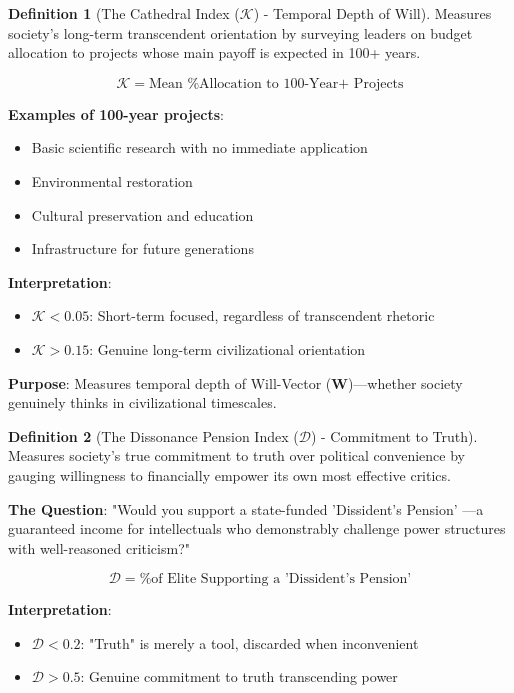 \documentclass[11pt,a4paper]{article}
\theoremstyle{definition}
\newtheorem{definition}{Definition}[section]
\theoremstyle{remark}
\begin{document}
\begin{small}
\begin{definition}[The Cathedral Index (\(\mathcal{K}\)) - Temporal Depth of Will]
Measures society's long-term transcendent orientation by surveying leaders on budget allocation to projects whose main payoff is expected in 100+ years.

\begin{equation}
\mathcal{K} = \text{Mean \% Allocation to 100-Year+ Projects}
\end{equation}

\textbf{Examples of 100-year projects}:
\begin{itemize}
    \item Basic scientific research with no immediate application
    \item Environmental restoration
    \item Cultural preservation and education
    \item Infrastructure for future generations
\end{itemize}

\textbf{Interpretation}:
\begin{itemize}
    \item \(\mathcal{K} < 0.05\): Short-term focused, regardless of transcendent rhetoric
    \item \(\mathcal{K} > 0.15\): Genuine long-term civilizational orientation
\end{itemize}

\textbf{Purpose}: Measures temporal depth of Will-Vector (\(\mathbf{W}\))—whether society genuinely thinks in civilizational timescales.
\end{definition}

\begin{definition}[The Dissonance Pension Index (\(\mathcal{D}\)) - Commitment to Truth]
Measures society's true commitment to truth over political convenience by gauging willingness to financially empower its own most effective critics.

\textbf{The Question}: "Would you support a state-funded 'Dissident's Pension' —a guaranteed income for intellectuals who demonstrably challenge power structures with well-reasoned criticism?"

\begin{equation}
\mathcal{D} = \text{\% of Elite Supporting a 'Dissident's Pension'}
\end{equation}

\textbf{Interpretation}:
\begin{itemize}
    \item \(\mathcal{D} < 0.2\): "Truth" is merely a tool, discarded when inconvenient
    \item \(\mathcal{D} > 0.5\): Genuine commitment to truth transcending power
\end{itemize}


\end{definition}
\end{small}
\end{document}

